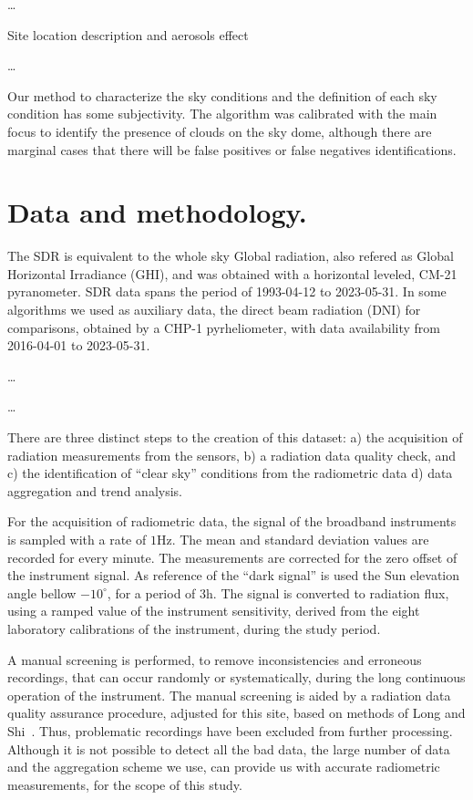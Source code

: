 \documentclass[preprint, 3p,
authoryear]{elsarticle} %
\begin{document}
\ldots{}

Site location description and aerosols effect

\ldots{}

Our method to characterize the sky conditions and the definition of each
sky condition has some subjectivity. The algorithm was calibrated with
the main focus to identify the presence of clouds on the sky dome,
although there are marginal cases that there will be false positives or
false negatives identifications.

\hypertarget{data-and-methodology.}{%
\section{Data and methodology.}\label{data-and-methodology.}}

The SDR is equivalent to the whole sky Global radiation, also refered as
Global Horizontal Irradiance (GHI), and was obtained with a horizontal
leveled, CM-21 pyranometer. SDR data spans the period of 1993-04-12 to
2023-05-31. In some algorithms we used as auxiliary data, the direct
beam radiation (DNI) for comparisons, obtained by a CHP-1 pyrheliometer,
with data availability from 2016-04-01 to 2023-05-31.

\ldots{}

\ldots{}

There are three distinct steps to the creation of this dataset: a) the
acquisition of radiation measurements from the sensors, b) a radiation
data quality check, and c) the identification of ``clear sky''
conditions from the radiometric data d) data aggregation and trend
analysis.

For the acquisition of radiometric data, the signal of the broadband
instruments is sampled with a rate of \(1 \text{Hz}\). The mean and
standard deviation values are recorded for every minute. The
measurements are corrected for the zero offset of the instrument signal.
As reference of the ``dark signal'' is used the Sun elevation angle
bellow \(-10^\circ\), for a period of \(3 \text{h}\). The signal is
converted to radiation flux, using a ramped value of the instrument
sensitivity, derived from the eight laboratory calibrations of the
instrument, during the study period.

A manual screening is performed, to remove inconsistencies and erroneous
recordings, that can occur randomly or systematically, during the long
continuous operation of the instrument. The manual screening is aided by
a radiation data quality assurance procedure, adjusted for this site,
based on methods of Long and
Shi~\citetext{\citeyear{long_automated_2008}; \citeyear{Long2006}}.
Thus, problematic recordings have been excluded from further processing.
Although it is not possible to detect all the bad data, the large number
of data and the aggregation scheme we use, can provide us with accurate
radiometric measurements, for the scope of this study.
\end{document}
